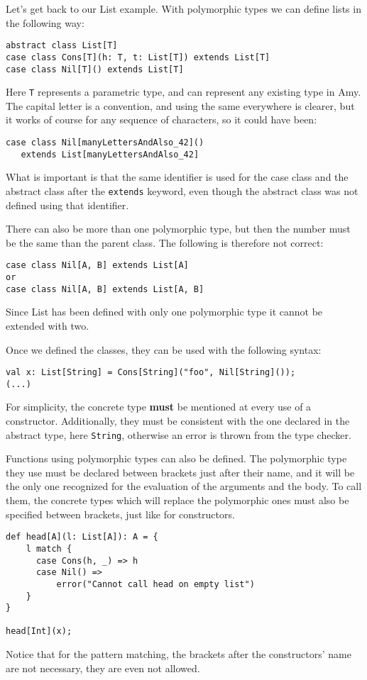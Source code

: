 \newcommand{\code}[1]{\texttt{#1}}

Let's get back to our List example. With polymorphic types we can define lists in the following way:

\begin{lstlisting}
abstract class List[T]
case class Cons[T](h: T, t: List[T]) extends List[T]
case class Nil[T]() extends List[T]
\end{lstlisting}

Here \code{T} represents a parametric type, and can represent any existing type in Amy. The capital letter is a convention, and using the same everywhere is clearer, but it works of course for any sequence of characters, so it could have been:
\begin{lstlisting}
case class Nil[manyLettersAndAlso_42]()
   extends List[manyLettersAndAlso_42]
\end{lstlisting}

What is important is that the same identifier is used for the case class and the abstract class after the \code{extends} keyword, even though the abstract class was not defined using that identifier.

There can also be more than one polymorphic type, but then the number must be the same than the parent class. The following is therefore not correct:
\begin{lstlisting}
case class Nil[A, B] extends List[A]
or
case class Nil[A, B] extends List[A, B]
\end{lstlisting}
Since List has been defined with only one polymorphic type it cannot be extended with two.


Once we defined the classes, they can be used with the following syntax:
\begin{lstlisting}
val x: List[String] = Cons[String]("foo", Nil[String]()); 
(...)
\end{lstlisting}

For simplicity, the concrete type \textbf{must} be mentioned at every use of a constructor. Additionally, they must be consistent with the one declared in the abstract type, here \code{String}, otherwise an error is thrown from the type checker.

Functions using polymorphic types can also be defined. The polymorphic type they use must be declared between brackets just after their name, and it will be the only one recognized for the evaluation of the arguments and the body. To call them, the concrete types which will replace the polymorphic ones must also be specified between brackets, just like for constructors.
\begin{lstlisting}
def head[A](l: List[A]): A = {
    l match {
      case Cons(h, _) => h
      case Nil() => 
          error("Cannot call head on empty list")
    }
}
  
head[Int](x);
\end{lstlisting}
Notice that for the pattern matching, the brackets after the constructors' name are not necessary, they are even not allowed.

